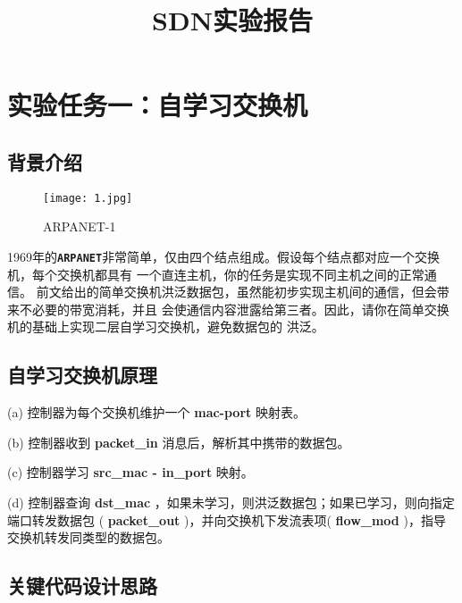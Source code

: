 \documentclass{xjtureport}
\title{SDN实验报告}
\date{\zhtoday}
\begin{document}
\makecover
\makeheader


\section{实验任务一：自学习交换机}
\subsection{背景介绍}
\begin{figure}[H]
	\centering
	\texttt{[image: 1.jpg]}
	\caption{ARPANET-1}
\end{figure}
1969年的\textbf{\texttt{ARPANET}}非常简单，仅由四个结点组成。假设每个结点都对应一个交换机，每个交换机都具有
一个直连主机，你的任务是实现不同主机之间的正常通信。
前文给出的简单交换机洪泛数据包，虽然能初步实现主机间的通信，但会带来不必要的带宽消耗，并且
会使通信内容泄露给第三者。因此，请你在简单交换机的基础上实现二层自学习交换机，避免数据包的
洪泛。
\subsection{自学习交换机原理}
(a) 控制器为每个交换机维护一个 \textbf{mac-port} 映射表。\par
(b) 控制器收到 \textbf{packet\_in} 消息后，解析其中携带的数据包。\par
(c) 控制器学习 \textbf{src\_mac - in\_port} 映射。\par
(d) 控制器查询 \textbf{dst\_mac} ，如果未学习，则洪泛数据包；如果已学习，则向指定端口转发数据包
( \textbf{packet\_out} )，并向交换机下发流表项( \textbf{flow\_mod} )，指导交换机转发同类型的数据包。
\subsection{关键代码设计思路}
\end{document}

